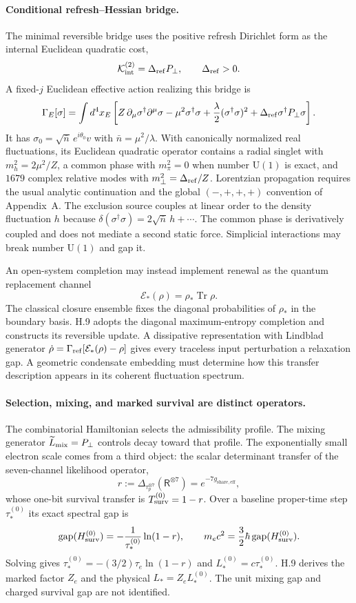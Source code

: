 \documentclass[11pt]{article}
\begin{document}
\paragraph{Conditional refresh--Hessian bridge.}
The minimal reversible bridge uses the positive refresh Dirichlet form as the internal Euclidean quadratic cost,
\[
\mathcal K_{\rm int}^{(2)}=\Delta_{\rm ref}P_\perp,
\qquad \Delta_{\rm ref}>0.
\]
A fixed-$j$ Euclidean effective action realizing this bridge is
\[
\Gamma_E[\sigma]=\int d^4x_E\left[
Z\,\partial_\mu\sigma^\dagger\partial^\mu\sigma
-\mu^2\sigma^\dagger\sigma
+\frac{\lambda}{2}(\sigma^\dagger\sigma)^2
+\Delta_{\rm ref}\sigma^\dagger P_\perp\sigma
\right].
\]
It has $\sigma_0=\sqrt{\bar n}\,e^{i\theta_0}v$ with $\bar n=\mu^2/\lambda$. With canonically normalized real fluctuations, its Euclidean quadratic operator contains a radial singlet with $m_h^2=2\mu^2/Z$, a common phase with $m_\pi^2=0$ when number $\mathrm U(1)$ is exact, and $1679$ complex relative modes with $m_\perp^2=\Delta_{\rm ref}/Z$. Lorentzian propagation requires the usual analytic continuation and the global $(-,+,+,+)$ convention of Appendix~A. The exclusion source couples at linear order to the density fluctuation $h$ because $\delta(\sigma^\dagger\sigma)=2\sqrt{\bar n}\,h+\cdots$. The common phase is derivatively coupled and does not mediate a second static force. Simplicial interactions may break number $\mathrm U(1)$ and gap it.

An open-system completion may instead implement renewal as the quantum replacement channel
\[
\mathcal E_*(\rho)=\rho_*\operatorname{Tr}\rho.
\]
The classical closure ensemble fixes the diagonal probabilities of $\rho_*$ in the boundary basis. H.9 adopts the diagonal maximum-entropy completion and constructs its reversible update. A dissipative representation with Lindblad generator $\dot\rho=\Gamma_{\rm ref}[\mathcal E_*(\rho)-\rho]$ gives every traceless input perturbation a relaxation gap. A geometric condensate embedding must determine how this transfer description appears in its coherent fluctuation spectrum.

\paragraph{Selection, mixing, and marked survival are distinct operators.}
The combinatorial Hamiltonian selects the admissibility profile. The mixing generator $\widetilde L_{\rm mix}=P_\perp$ controls decay toward that profile. The exponentially small electron scale comes from a third object: the scalar determinant transfer of the seven-channel likelihood operator,
\[
r:=\Delta_{\tau_p^{\otimes7}}(\mathsf R^{\otimes7})
=e^{-7g_{\mathrm{share,eff}}},
\]
whose one-bit survival transfer is $T_{\rm surv}^{(0)}=1-r$. Over a baseline proper-time step $\tau_*^{(0)}$ its exact spectral gap is
\[
\mathrm{gap}(H_{\rm surv}^{(0)})
=-\frac{1}{\tau_*^{(0)}}\ln(1-r),
\qquad
m_ec^2=\frac32\hbar\,\mathrm{gap}(H_{\rm surv}^{(0)}).
\]
Solving gives $\tau_*^{(0)}=-(3/2)\tau_e\ln(1-r)$ and $L_*^{(0)}=c\tau_*^{(0)}$. H.9 derives the marked factor $Z_e$ and the physical $L_*=Z_eL_*^{(0)}$. The unit mixing gap and charged survival gap are not identified.
\end{document}
